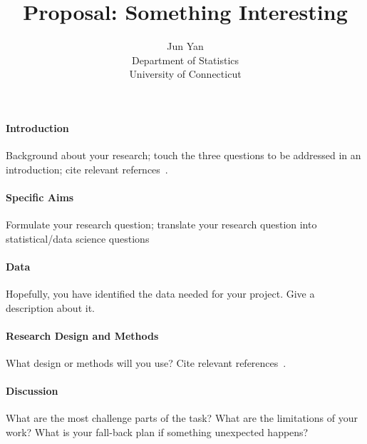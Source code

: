 \documentclass[12pt]{article}
\title{Proposal: Something Interesting}
\author{Jun Yan\\
  Department of Statistics\\
  University of Connecticut
}
\begin{document}
\maketitle


\paragraph{Introduction}
Background about your research; touch the three questions to be addressed in an
introduction; cite relevant refernces~\citep[e.g.,][]{dwivedi2017analysis}.

\lipsum[1]

\paragraph{Specific Aims}
Formulate your research question;
translate your research question into statistical/data science questions

\lipsum[2]

\paragraph{Data}
Hopefully, you have identified the data needed for your project. Give a
description about it.

\lipsum[3]

\paragraph{Research Design and Methods}
What design or methods will you use?
Cite relevant references~\citep[e.g.,][]{wild2004global}.

\lipsum[4]

\paragraph{Discussion}
What are the most challenge parts of the task?
What are the limitations of your work? What is your fall-back plan if
something unexpected happens?

\lipsum[5]



\end{document}
